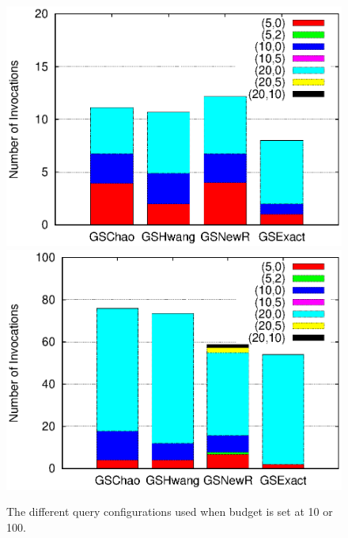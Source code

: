 \begin{figure}[h]
	\vspace{-5pt}
   	 \includegraphics[clip,scale=0.32]{figs/queryConfBudget10.eps}
	\hspace{-10pt}
	\includegraphics[clip,scale=0.32]{figs/queryConfBudget100.eps}
	\vspace{-10pt}
	\caption{The different query configurations used when budget is set at 10 or 100.}\label{fig:queryconf}
	\vspace{-15pt}
\end{figure}



